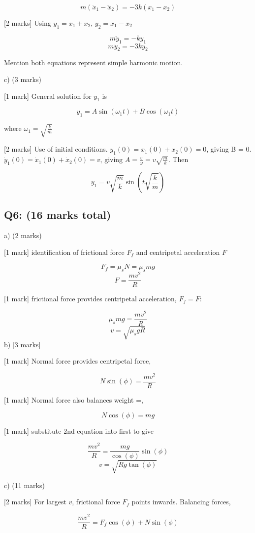 \documentclass[a4paper,11pt]{article}
\begin{document}
\[ m( \ddot{x}_1 - \ddot{x}_2 ) = -3k(x_1 - x_2) \]

[2 marks] Using \( y_{1} = x_{1} + x_{2} \), \( y_{2} = x_{1} - x_{2} \)

\[ m \ddot{y}_1 = -k y_1 \]
\[ m \ddot{y}_2 = -3k y_2 \]

Mention both equations represent simple harmonic motion.

c) (3 marks)

 [1 mark] General solution for \( y_1 \) is 

\[ y_1 = A \sin(\omega_1 t) + B \cos(\omega_1 t) \]

where \(\omega_1 = \sqrt{\frac{k}{m}}\)

[2 marks] Use of initial conditions. \( y_1(0) = x_1(0) + x_2(0) = 0 \), giving B = 0. \( \dot{y}_1(0) = \dot{x}_1(0) + \dot{x}_2(0) = v \), giving \( A = \frac{v}{\omega} = v\sqrt{\frac{m}{k}} \). Then 

\[ y_1 = v\sqrt{\frac{m}{k}} \sin \left ( t \sqrt{\frac{k}{m}} \right ) \]

\subsection*{Q6: (16 marks total)}

a) (2 marks)

[1 mark] identification of frictional force \( F_f \) and centripetal acceleration \( F \)

\[ F_f = \mu_s N = \mu_s mg \]
\[ F = \frac{m v^2}{R} \]

[1 mark] frictional force provides centripetal acceleration, \(F_f = F \):

\[ \mu_s mg = \frac{m v^2}{R} \]
\[ v = \sqrt{\mu_s g R} \]
b) [3 marks]

[1 mark] Normal force provides centripetal force,

\[ N \sin(\phi) = \frac{m v^2}{R} \]

[1 mark] Normal force also balances weight =, 

\[ N \cos(\phi) = mg \]

[1 mark] substitute 2nd equation into first to give 

\[ \frac{m v^2}{R} = \frac{mg}{\cos(\phi)} \sin(\phi) \]
\[ v = \sqrt{R g \tan(\phi)} \]

c) (11 marks)

[2 marks] For largest \( v \), frictional force \( F_f \) points inwards. Balancing forces, 

\[ \frac{m v^2}{R} = F_f \cos(\phi) + N \sin(\phi) \]
\end{document}
